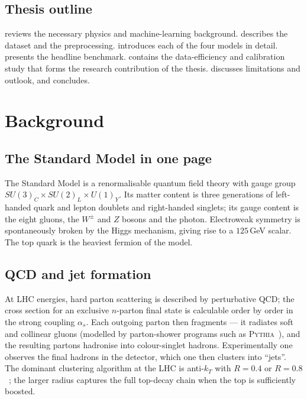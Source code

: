 \documentclass[12pt,a4paper,oneside]{report}
\begin{document}
\section{Thesis outline}
 reviews the necessary physics and machine-learning
background.   describes the dataset and the
preprocessing.   introduces each of the four models
in detail.   presents the headline benchmark.
 contains the data-efficiency and calibration study
that forms the research contribution of the thesis.
 discusses limitations and outlook, and
 concludes.

\chapter{Background}\label{ch:bg}

\section{The Standard Model in one page}
The Standard Model is a renormalisable quantum field theory with
gauge group $SU(3)_C\!\times\!SU(2)_L\!\times\!U(1)_Y$.  Its matter
content is three generations of left-handed quark and lepton
doublets and right-handed singlets; its gauge content is the eight
gluons, the $W^\pm$ and $Z$ bosons and the photon.  Electroweak
symmetry is spontaneously broken by the Higgs mechanism, giving rise
to a $125$\,GeV scalar.  The top quark is the heaviest fermion of
the model.

\section{QCD and jet formation}
At LHC energies, hard parton scattering is described by perturbative
QCD; the cross section for an exclusive $n$-parton final state is
calculable order by order in the strong coupling $\alpha_s$.
Each outgoing parton then fragments --- it radiates soft and
collinear gluons (modelled by parton-shower programs such as
\textsc{Pythia}~\cite{pythia}), and the resulting partons hadronise
into colour-singlet hadrons.  Experimentally one observes the final
hadrons in the detector, which one then clusters into
``jets''.  The dominant clustering algorithm at the LHC is
anti-$k_T$ with $R\!=\!0.4$ or $R\!=\!0.8$~\cite{cacciari}; the
larger radius captures the full top-decay chain when the top is
sufficiently boosted.
\end{document}
